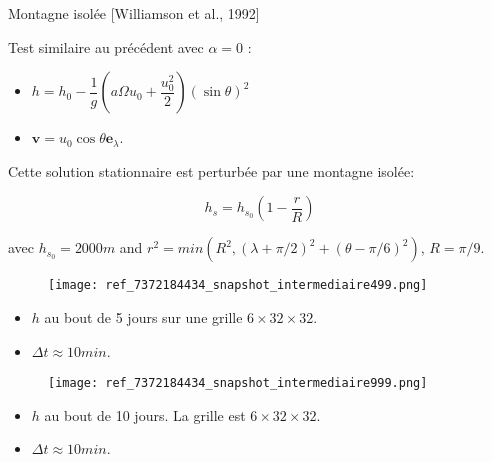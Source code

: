 \documentclass[11pt]{beamer}
\begin{document}
\begin{frame}{Montagne isolée [Williamson et al., 1992]}

\begin{exampleblock}{}
Test similaire au précédent avec $\alpha = 0$ :

\begin{itemize}
\item $h = h_0 - \dfrac{1}{g} \left( a \Omega u_0 + \dfrac{u_0^2}{2} \right)(\sin \theta)^2$
\item $\mathbf{v} = u_0 \cos \theta \mathbf{e}_{\lambda}$.
\end{itemize}

Cette solution stationnaire est perturbée par une montagne isolée:

$$h_s = h_{s_0} \left( 1 - \dfrac{r}{R} \right)$$

avec $h_{s_0}=2000m$ and $r^2=min(R^2, (\lambda + \pi/2)^2+(\theta - \pi/6)^2)$, $R=\pi/9$.
\end{exampleblock}
\end{frame}



\begin{frame}{}
\begin{figure}
\texttt{[image: ref\_7372184434\_snapshot\_intermediaire499.png]}
\end{figure}
\begin{itemize}
\item $h$ au bout de 5 jours sur une grille $6 \times 32 \times 32$.
\item $\Delta t \approx 10min$.
\end{itemize}
\end{frame}



\begin{frame}{}
\begin{figure}
\texttt{[image: ref\_7372184434\_snapshot\_intermediaire999.png]}
\end{figure}
\begin{itemize}
\item $h$ au bout de 10 jours. La grille est $6 \times 32 \times 32$.
\item $\Delta t \approx 10min$.
\end{itemize}
\end{frame}
\end{document}
